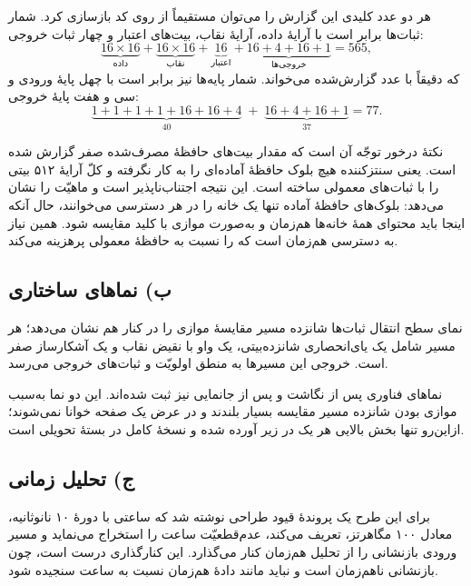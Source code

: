 \documentclass[12pt,a4paper]{article}
\begin{document}

	هر دو عدد کلیدی این گزارش را می‌توان مستقیماً از روی کد بازسازی کرد. شمار ثبات‌ها برابر است با آرایهٔ داده، آرایهٔ نقاب، بیت‌های اعتبار و چهار ثبات خروجی:
	\[
	\underbrace{16\times16}_{\text{داده}} + \underbrace{16\times16}_{\text{نقاب}} + \underbrace{16}_{\text{اعتبار}} + \underbrace{16+4+16+1}_{\text{خروجی‌ها}} = 565 ,
	\]
	که دقیقاً با عدد گزارش‌شده می‌خواند. شمار پایه‌ها نیز برابر است با چهل پایهٔ ورودی و سی و هفت پایهٔ خروجی:
	\[
	\underbrace{1+1+1+1+16+16+4}_{40} \;+\; \underbrace{16+4+16+1}_{37} = 77 .
	\]

	نکتهٔ درخور توجّه آن است که مقدار بیت‌های حافظهٔ مصرف‌شده صفر گزارش شده است. یعنی سنتز‌کننده هیچ بلوک حافظهٔ آماده‌ای را به کار نگرفته و کلّ آرایهٔ ۵۱۲ بیتی را با ثبات‌های معمولی ساخته است. این نتیجه اجتناب‌ناپذیر است و ماهیّت  را نشان می‌دهد: بلوک‌های حافظهٔ آماده تنها یک خانه را در هر دسترسی می‌خوانند، حال آنکه اینجا باید محتوای همهٔ خانه‌ها هم‌زمان و به‌صورت موازی با کلید مقایسه شود. همین نیاز به دسترسی هم‌زمان است که  را نسبت به حافظهٔ معمولی پرهزینه می‌کند.

	\subsection*{ب) نماهای ساختاری}
	نمای سطح انتقال ثبات‌ها شانزده مسیر مقایسهٔ موازی را در کنار هم نشان می‌دهد؛ هر مسیر شامل یک یای‌انحصاری شانزده‌بیتی، یک واو با نقیض نقاب و یک آشکارساز صفر است. خروجی این مسیرها به منطق اولویّت و ثبات‌های خروجی می‌رسد.


	نماهای فناوری پس از نگاشت و پس از جانمایی نیز ثبت شده‌اند. این دو نما به‌سبب موازی بودن شانزده مسیر مقایسه بسیار بلندند و در عرض یک صفحه خوانا نمی‌شوند؛ ازاین‌رو تنها بخش بالایی هر یک در زیر آورده شده و نسخهٔ کامل در بستهٔ تحویلی است.


	\subsection*{ج) تحلیل زمانی}
	برای این طرح یک پروندهٔ قیود طراحی نوشته شد که ساعتی با دورهٔ ۱۰ نانوثانیه، معادل ۱۰۰ مگاهرتز، تعریف می‌کند، عدم‌قطعیّت ساعت را استخراج می‌نماید و مسیر ورودی بازنشانی را از تحلیل هم‌زمان کنار می‌گذارد. این کنارگذاری درست است، چون بازنشانی ناهم‌زمان است و نباید مانند دادهٔ هم‌زمان نسبت به ساعت سنجیده شود.
\end{document}
